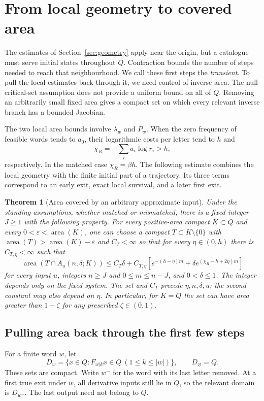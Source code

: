 \documentclass[11pt]{amsart}
\newtheorem{theorem}{Theorem}[section]
\theoremstyle{definition}
\theoremstyle{remark}
\newcommand{\area}{\operatorname{area}}
\numberwithin{equation}{section}
\begin{document}
\section{From local geometry to covered area}\label{sec:area}
The estimates of Section~\ref{sec:geometry} apply near the origin,
but a catalogue must serve initial states throughout $Q$.
Contraction bounds the number of steps needed to reach that
neighbourhood. We call these first steps the \emph{transient}.
To pull the local estimates back through it, we need control of
inverse area. The null-critical-set assumption does not provide
a uniform bound on all of $Q$. Removing an arbitrarily small
fixed area gives a compact set on
which every relevant inverse branch has a bounded Jacobian.

The two local area bounds involve $\lambda_w$ and $P_w$.
When the zero frequency of feasible words tends to $a_0$, their
logarithmic costs per letter tend to $h$ and
\begin{equation}\label{eq:radialparameters}
\chi_R=-\sum_i a_i\log r_i>h,
\end{equation}
respectively. In the matched case $\chi_R=\beta h$.
The following estimate combines the local geometry with the
finite initial part of a trajectory. Its three terms correspond
to an early exit, exact local survival, and a later first exit.

\begin{theorem}[Area covered by an arbitrary approximate input]\label{thm:area}
Under the standing assumptions, whether matched or mismatched,
there is a fixed integer $J\ge1$ with
the following property. For every positive-area compact $K\subset Q$
and every $0<\varepsilon<\area(K)$,
one can choose a compact $T\subset K\setminus\{0\}$ with
$\area(T)>\area(K)-\varepsilon$ and $C_T<\infty$
so that for every $\eta\in(0,h)$ there is $C_{T,\eta}<\infty$
such that
\begin{equation}\label{eq:actualarea}
\area(T\cap A_u(n,\delta;K))\le C_T\delta+
C_{T,\eta}\left[e^{-(h-\eta)m}+\delta e^{(\chi_R-h+2\eta)m}\right]
\end{equation}
for every input $u$, integers $n\ge J$ and $0\le m\le n-J$,
and $0<\delta\le1$.
The integer depends only on the fixed system. The set and $C_T$
precede $\eta,n,\delta,u$; the second constant may also depend on $\eta$.
In particular, for $K=Q$ the set can have area greater than
$1-\zeta$ for any prescribed $\zeta\in(0,1)$.
\end{theorem}

\subsection{Pulling area back through the first few steps}
For a finite word \(w\), let
\begin{equation}\label{eq:feasibledomains}
D_w=\{x\in Q:F_{w|k}x\in Q\ (1\le k\le|w|)\},
\qquad D_\varnothing=Q.
\end{equation}
These sets are compact. Write \(w^-\) for the word with its last
letter removed. At a first true exit under \(w\), all derivative
inputs still lie in \(Q\), so the relevant domain is \(D_{w^-}\).
The last output need not belong to \(Q\).
\end{document}
